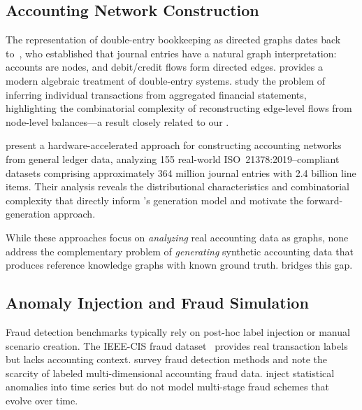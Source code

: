 \subsection{Accounting Network Construction}
\label{sec:rw_networks}

The representation of double-entry bookkeeping as directed graphs dates
back to~\citet{ijiri1965generalized}, who established that journal entries
have a natural graph interpretation: accounts are nodes, and debit/credit
flows form directed edges.  \citet{fellingham2018double} provides a modern
algebraic treatment of double-entry systems.
\citet{arya2000inferring} study the problem of inferring individual
transactions from aggregated financial statements, highlighting the
combinatorial complexity of reconstructing edge-level flows from
node-level balances---a result closely related to our
.

\citet{ivertowski2024hardware} present a hardware-accelerated approach
for constructing accounting networks from general ledger data, analyzing
155 real-world ISO~21378:2019--compliant datasets comprising
approximately 364 million journal entries with 2.4 billion line items.
Their analysis reveals the distributional characteristics and
combinatorial complexity that directly inform \system{}'s generation
model and motivate the forward-generation approach.

While these approaches focus on \emph{analyzing} real accounting data as
graphs, none address the complementary problem of \emph{generating}
synthetic accounting data that produces reference knowledge graphs with
known ground truth.  \system{} bridges this gap.

\subsection{Anomaly Injection and Fraud Simulation}
\label{sec:rw_anomaly}

Fraud detection benchmarks typically rely on post-hoc label injection
or manual scenario creation.  The IEEE-CIS fraud dataset~\citep{ieee_cis2019}
provides real transaction labels but lacks accounting context.
\citet{pourhabibi2020fraud} survey fraud detection methods and note the
scarcity of labeled multi-dimensional accounting fraud data.
\citet{dbouk2022anomaly} inject statistical anomalies into time series
but do not model multi-stage fraud schemes that evolve over time.

